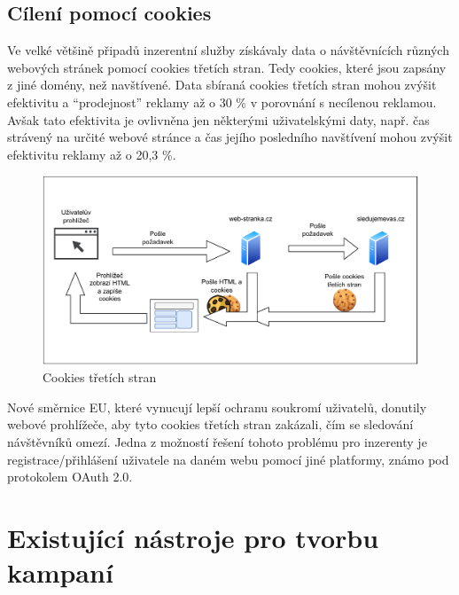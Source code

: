 \subsection{Cílení pomocí cookies}
Ve velké většině připadů inzerentní služby získávaly data o návštěvnících různých webových stránek pomocí cookies třetích stran. Tedy cookies, které
jsou zapsány z jiné domény, než navštívené. Data sbíraná cookies třetích stran mohou zvýšit efektivitu a \enquote{prodejnost} reklamy až o 30 \% v porovnání s necílenou reklamou.
Avšak tato efektivita je ovlivněna jen některými uživatelskými daty, např. čas strávený na určité webové stránce a čas jejího posledního navštívení mohou zvýšit efektivitu reklamy
až o 20,3 \%.\cite{cookies}
\begin{figure}[h]
    \includegraphics[width=1.0\textwidth]{Figures/cookies.drawio.pdf}
    \caption{Cookies třetích stran}
    \label{fig:cookies}
\end{figure}
Nové směrnice EU, které vynucují lepší ochranu soukromí uživatelů, donutily webové prohlížeče, aby tyto cookies třetích stran zakázali, čím se sledování
návštěvníků omezí. Jedna z možností řešení tohoto problému pro inzerenty je registrace/přihlášení uživatele na daném webu pomocí jiné platformy, známo pod protokolem
OAuth 2.0.

\section{Existující nástroje pro tvorbu kampaní}

